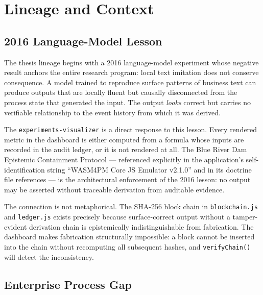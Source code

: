 
\section{Lineage and Context}
\label{sec:experiments-visualizer-lineage}

\subsection{2016 Language-Model Lesson}
\label{sec:experiments-visualizer-lineage-2016}

The thesis lineage begins with a 2016 language-model experiment whose negative result anchors
the entire research program: local text imitation does not conserve consequence. A model trained
to reproduce surface patterns of business text can produce outputs that are locally fluent but
causally disconnected from the process state that generated the input. The output \emph{looks}
correct but carries no verifiable relationship to the event history from which it was derived.

The \texttt{experiments-visualizer} is a direct response to this lesson. Every rendered metric
in the dashboard is either computed from a formula whose inputs are recorded in the audit ledger,
or it is not rendered at all. The Blue River Dam Epistemic Containment Protocol — referenced
explicitly in the application's self-identification string ``WASM4PM Core JS Emulator v2.1.0''
and in its doctrine file references — is the architectural enforcement of the 2016 lesson:
no output may be asserted without traceable derivation from auditable evidence.

The connection is not metaphorical. The SHA-256 block chain in \texttt{blockchain.js} and
\texttt{ledger.js} exists precisely because surface-correct output without a tamper-evident
derivation chain is epistemically indistinguishable from fabrication. The dashboard makes
fabrication structurally impossible: a block cannot be inserted into the chain without
recomputing all subsequent hashes, and \texttt{verifyChain()} will detect the inconsistency.

\subsection{Enterprise Process Gap}
\label{sec:experiments-visualizer-lineage-gap}

